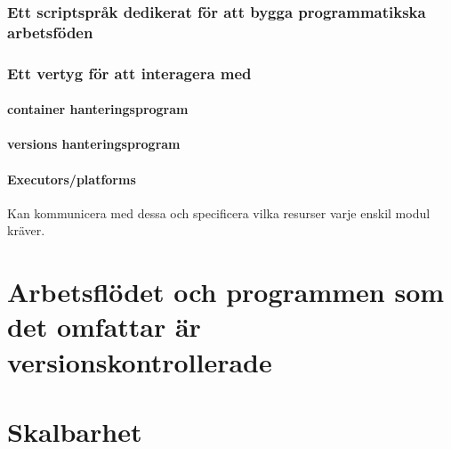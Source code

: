 \documentclass[
  letterpaper,
  DIV=11,
  numbers=noendperiod]{scrreprt}
\begin{document}
\subsection{Ett scriptspråk dedikerat för att bygga programmatikska
arbetsföden}\label{ett-scriptspruxe5k-dedikerat-fuxf6r-att-bygga-programmatikska-arbetsfuxf6den}

\subsection{Ett vertyg för att interagera
med}\label{ett-vertyg-fuxf6r-att-interagera-med}

\subsubsection{container
hanteringsprogram}\label{container-hanteringsprogram}

\subsubsection{versions
hanteringsprogram}\label{versions-hanteringsprogram}

\subsubsection{Executors/platforms}\label{executorsplatforms}

Kan kommunicera med dessa och specificera vilka resurser varje enskil
modul kräver.

\subsubsection{}\label{section-3}


\chapter{Arbetsflödet och programmen som det omfattar är
versionskontrollerade}\label{arbetsfluxf6det-och-programmen-som-det-omfattar-uxe4r-versionskontrollerade}


\chapter{Skalbarhet}\label{skalbarhet}

\end{document}
